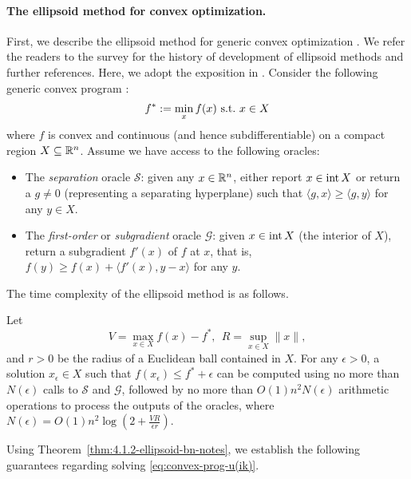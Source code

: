 \paragraph{The ellipsoid method for convex optimization.}
First, we describe the ellipsoid method for generic convex optimization \citep{shor1977cut,yudin1976informational,yudin1976evaluation,Nemirovski1977optimization}. 
We refer the readers to the survey \citep{bland1981ellipsoid} for the history of development of ellipsoid methods and further references. 
Here, we adopt the exposition in \citep{ben2019lectures}.
Consider the following generic convex program \citep[\S 4.1.4]{ben2019lectures}:
\begin{align}
	f^*:= \min_x f(x) \ {\rm s.t.}\  x\in X \label{eq:generic-constrained-minimization}
\end{align}
where $f$ is convex and continuous (and hence subdifferentiable) on a compact region $X\subseteq \mathbb{R}^n$.
Assume we have access to the following oracles:
\begin{itemize}
	\item The \emph{separation} oracle $\mathcal{S}$: given any $x\in \mathbb{R}^n$, either report $x\in \textnormal{int}\, X$ or return a $g\neq 0$ (representing a separating hyperplane) such that $\langle g, x\rangle \geq \langle g, y\rangle$ for any $y\in X$. 
	\item The \emph{first-order} or \emph{subgradient} oracle $\mathcal{G}$: given $x\in \textnormal{int}\, X$ (the interior of $X$), return a subgradient $f'(x)$ of $f$ at $x$, that is, $f(y) \geq f(x) + \langle f'(x), y-x\rangle$ for any $y$.
\end{itemize} 
The time complexity of the ellipsoid method is as follows.
\begin{theorem} \cite[Theorem 4.1.2]{ben2019lectures}
	Let 
	\[V = \max_{x\in X} f(x) - f^*,\ \ R = \sup_{x\in X} \|x\|,\] and $r>0$ be the radius of a Euclidean ball contained in $X$.
	For any $\epsilon>0$, a solution $x_\epsilon\in X$ such that $f(x_\epsilon) \leq f^* + \epsilon$ can be computed using no more than $N(\epsilon)$ calls to $\mathcal{S}$ and $\mathcal{G}$, followed by no more than $O(1)n^2 N(\epsilon)$ arithmetic operations to process the outputs of the oracles, where 
	$N(\epsilon) = O(1) n^2 \log \left( 2+ \frac{V R}{\epsilon r} \right)$.
	\label{thm:4.1.2-ellipsoid-bn-notes}
\end{theorem}
Using Theorem~\ref{thm:4.1.2-ellipsoid-bn-notes}, we establish the following guarantees regarding solving \eqref{eq:convex-prog-u(ik)}.
